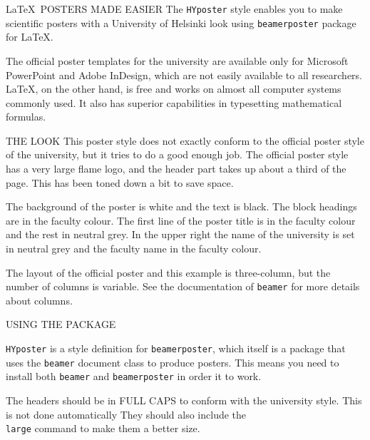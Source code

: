 \documentclass[final]{beamer}
\author[Wilkman]{Olli Wilkman}
\institute[University of Helsinki]{}
\date{\today}
\begin{document}
\begin{frame}[t, fragile]
\begin{columns}[T]
	
\begin{column}{0.32\linewidth}


\begin{block}{\LaTeX~POSTERS MADE EASIER}
The \texttt{HYposter} style enables you to make scientific posters with a University of Helsinki look using  \texttt{beamerposter} package for \LaTeX. 

The official poster templates for the university are available only for Microsoft PowerPoint and Adobe InDesign, which are not easily available to all researchers. \LaTeX, on the other hand, is free and works on almost all computer systems commonly used. It also has superior capabilities in typesetting mathematical formulas.

\end{block}


\begin{block}{THE LOOK}
This poster style does not exactly conform to the official poster style of the university, but it tries to do a good enough job. The official poster style has a very large flame logo, and the header part takes up about a third of the page. This has been toned down a bit to save space.

The background of the poster is white and the text is black. The block headings are in the faculty colour. The first line of the poster title is in the faculty colour and the rest in neutral grey. In the upper right the name of the university is set in neutral grey and the faculty name in the faculty colour.

The layout of the official poster and this example is three-column, but the number of columns is variable. See the documentation of \texttt{beamer} for more details about columns.
\end{block}


\begin{block}{USING THE PACKAGE}

\texttt{HYposter} is a style definition for \texttt{beamerposter}, which itself is a package that uses the \texttt{beamer} document class to produce posters. This means you need to install both \texttt{beamer} and \texttt{beamerposter} in order it to work.

The headers should be in FULL CAPS to conform with the university style. This is not done automatically They should also include the \texttt{\\large} command to make them a better size.
\end{block}


\end{column}
\end{columns}
\end{frame}
\end{document}
